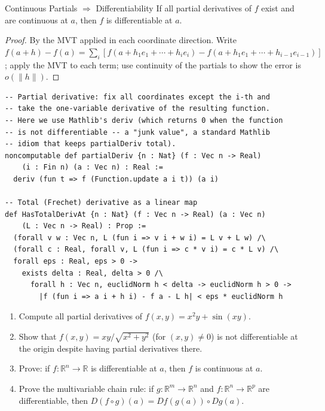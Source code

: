\documentclass[12pt, openany]{book}
\theoremstyle{plain}
\theoremstyle{definition}
\theoremstyle{remark}
\newcommand{\R}{\mathbb{R}}
\begin{document}
\begin{thmbox}{Continuous Partials $\Rightarrow$ Differentiability}
If all partial derivatives of $f$ exist and are continuous at $a$, then $f$ is differentiable at $a$.
\end{thmbox}
\color{black}

\begin{proof}
By the MVT applied in each coordinate direction. Write $f(a+h) - f(a) = \sum_i [f(a + h_1 e_1 + \cdots + h_i e_i) - f(a + h_1 e_1 + \cdots + h_{i-1} e_{i-1})]$; apply the MVT to each term; use continuity of the partials to show the error is $o(\|h\|)$.
\end{proof}

\begin{leanbox}
\begin{lstlisting}
-- Partial derivative: fix all coordinates except the i-th and
-- take the one-variable derivative of the resulting function.
-- Here we use Mathlib's deriv (which returns 0 when the function
-- is not differentiable -- a "junk value", a standard Mathlib
-- idiom that keeps partialDeriv total).
noncomputable def partialDeriv {n : Nat} (f : Vec n -> Real)
    (i : Fin n) (a : Vec n) : Real :=
  deriv (fun t => f (Function.update a i t)) (a i)

-- Total (Frechet) derivative as a linear map
def HasTotalDerivAt {n : Nat} (f : Vec n -> Real) (a : Vec n)
    (L : Vec n -> Real) : Prop :=
  (forall v w : Vec n, L (fun i => v i + w i) = L v + L w) /\
  (forall c : Real, forall v, L (fun i => c * v i) = c * L v) /\
  forall eps : Real, eps > 0 ->
    exists delta : Real, delta > 0 /\
      forall h : Vec n, euclidNorm h < delta -> euclidNorm h > 0 ->
        |f (fun i => a i + h i) - f a - L h| < eps * euclidNorm h
\end{lstlisting}
\end{leanbox}
\color{black}

\begin{exbox}
\begin{enumerate}
  \item Compute all partial derivatives of $f(x,y) = x^2 y + \sin(xy)$.
  \item Show that $f(x,y) = xy/\sqrt{x^2+y^2}$ (for $(x,y) \neq 0$) is not differentiable at the origin despite having partial derivatives there.
  \item Prove: if $f : \R^n \to \R$ is differentiable at $a$, then $f$ is continuous at $a$.
  \item Prove the multivariable chain rule: if $g : \R^m \to \R^n$ and $f : \R^n \to \R^p$ are differentiable, then $D(f \circ g)(a) = Df(g(a)) \circ Dg(a)$.
\end{enumerate}
\end{exbox}
\color{black}
\end{document}
